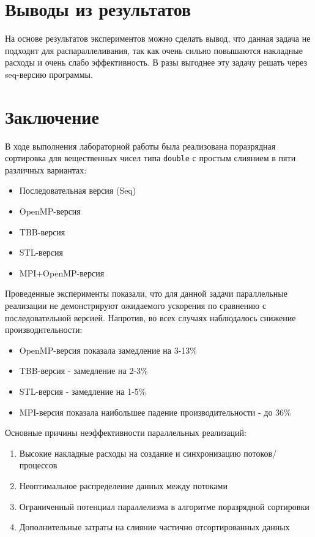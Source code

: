 \documentclass[a4paper,12pt]{article}
\begin{document}
\section{Выводы из результатов}
На основе результатов экспериментов можно сделать вывод, что данная задача не подходит для распараллеливания, так как очень сильно повышаются накладные расходы и очень слабо эффективность. В разы выгоднее эту задачу решать через seq-версию программы.
\newpage
\section{Заключение}
В ходе выполнения лабораторной работы была реализована поразрядная сортировка для вещественных чисел типа \texttt{double} с простым слиянием в пяти различных вариантах:
\begin{itemize}
    \item Последовательная версия (Seq)
    \item OpenMP-версия
    \item TBB-версия
    \item STL-версия
    \item MPI+OpenMP-версия
\end{itemize}

Проведенные эксперименты показали, что для данной задачи параллельные реализации не демонстрируют ожидаемого ускорения по сравнению с последовательной версией. Напротив, во всех случаях наблюдалось снижение производительности:
\begin{itemize}
    \item OpenMP-версия показала замедление на 3-13\%
    \item TBB-версия - замедление на 2-3\%
    \item STL-версия - замедление на 1-5\%
    \item MPI-версия показала наибольшее падение производительности - до 36\%
\end{itemize}

Основные причины неэффективности параллельных реализаций:
\begin{enumerate}
    \item Высокие накладные расходы на создание и синхронизацию потоков/процессов
    \item Неоптимальное распределение данных между потоками
    \item Ограниченный потенциал параллелизма в алгоритме поразрядной сортировки
    \item Дополнительные затраты на слияние частично отсортированных данных
\end{enumerate}
\end{document}

